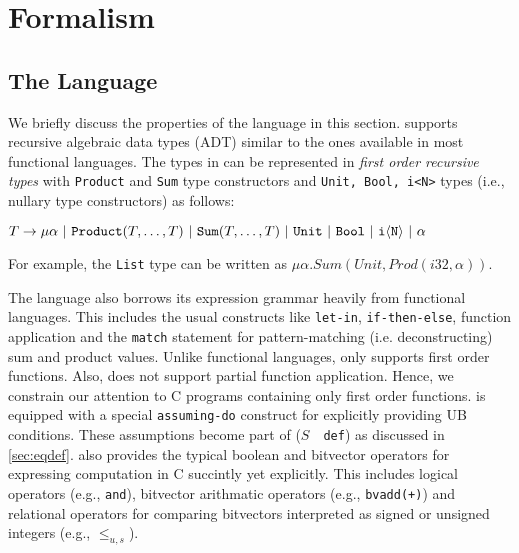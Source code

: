 \section{Formalism}
\label{sec:formalism}
\subsection{The \SpecL{} Language}
\label{sec:speclang}
We briefly discuss the properties of the \SpecL{} language in this section.
\SpecL{} supports recursive algebraic data types (ADT) similar to the ones available in most functional languages.
The types in \SpecL{} can be represented in {\em first order recursive types} with {\tt Product} and {\tt Sum}
type constructors and {\tt Unit, Bool, i<N>} types (i.e., nullary type constructors) as follows:

$T \rightarrow {\tt \mu} \alpha \ |\  {\tt Product}(T,\dots,T) \ |\  {\tt Sum}(T,\dots,T) \ |\  {\tt Unit} \ |\ {\tt Bool} \ |\  {\tt i\langle N \rangle} \ |\  \alpha$

For example, the {\tt List} type can be written as $\mu \alpha. Sum(Unit, Prod(i32,\alpha))$.

The language also borrows its expression grammar heavily from functional languages.
This includes the usual constructs like {\tt let-in}, {\tt if-then-else}, function application and the {\tt match} statement
for pattern-matching (i.e. deconstructing) sum and product values.
Unlike functional languages, \SpecL{} only supports first order functions.
Also, \SpecL{} does not support partial function application.
Hence, we constrain our attention to C programs containing only first order functions.
\SpecL{} is equipped with a special {\tt assuming-do} construct for explicitly providing UB conditions.
These assumptions become part of ($S$\ \ {\tt def}) as discussed in \cref{sec:eqdef}.
\SpecL{} also provides the typical boolean and bitvector operators for expressing computation in C succintly yet explicitly.
This includes logical operators (e.g., {\tt and}), bitvector arithmatic operators (e.g., {\tt bvadd(+)}) and
relational operators for comparing bitvectors interpreted as signed or unsigned integers (e.g., {\tt $\leq_{u,s}$}).

